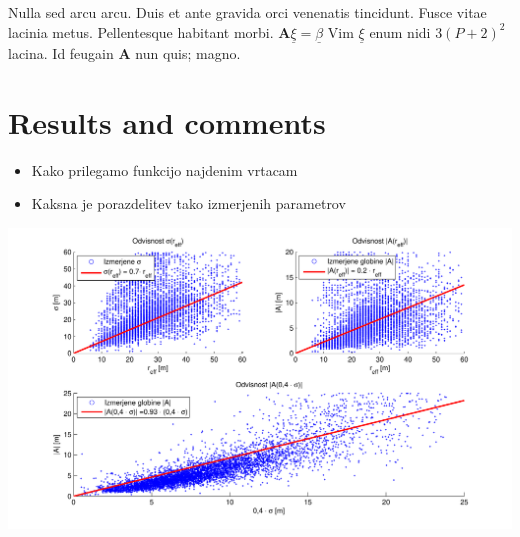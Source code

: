 \documentclass[a0,portrait]{a0poster}
\begin{document}
\begin{multicols}{2}
Nulla sed arcu arcu. Duis et ante gravida orci venenatis tincidunt. Fusce vitae lacinia metus. Pellentesque habitant morbi. $\mathbf{A}\underline{\xi}=\underline{\beta}$ Vim $\underline{\xi}$ enum nidi $3(P+2)^{2}$ lacina. Id feugain $\mathbf{A}$ nun quis; magno.


\section*{Results and comments}

\begin{itemize}
	\item Kako prilegamo funkcijo najdenim vrtacam
	\item Kaksna je porazdelitev tako izmerjenih parametrov
\end{itemize}

\begin{center}
\includegraphics[width=\linewidth]{menisija-A-sigma-reff.pdf}
\end{center}


\end{multicols}
\end{document}
